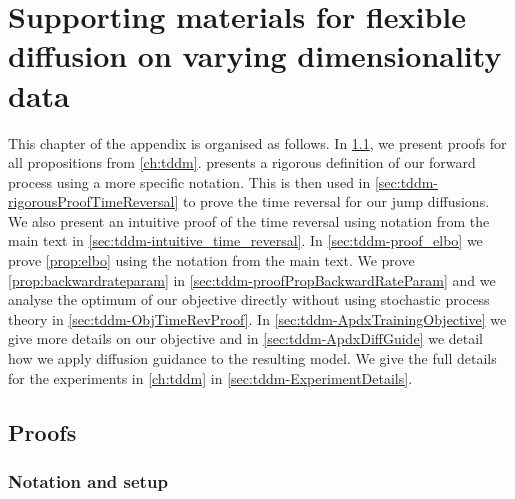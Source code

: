 \chapter{Supporting materials for flexible diffusion on varying dimensionality data}


This chapter of the appendix is organised as follows.  In \cref{sec:tddm-Proofs}, we present proofs for all propositions from \cref{ch:tddm}.  presents a rigorous definition of our forward process using a more specific notation. This is then used in \cref{sec:tddm-rigorousProofTimeReversal} to prove the time reversal for our jump diffusions. We also present an intuitive proof of the time reversal using notation from the main text in \cref{sec:tddm-intuitive_time_reversal}. In \cref{sec:tddm-proof_elbo} we prove \cref{prop:elbo} using the notation from the main text. We prove \cref{prop:backwardrateparam} in \cref{sec:tddm-proofPropBackwardRateParam} and we analyse the optimum of our objective directly without using stochastic process theory in \cref{sec:tddm-ObjTimeRevProof}. In \cref{sec:tddm-ApdxTrainingObjective} we give more details on our objective and in \cref{sec:tddm-ApdxDiffGuide} we detail how we apply diffusion guidance to the resulting model. We give the full details for the experiments in \cref{ch:tddm} in \cref{sec:tddm-ExperimentDetails}.

\section{Proofs}
\label{sec:tddm-Proofs}

\subsection{Notation and setup}
\label{sec:tddm-notation}

\def \msb {\mathsf{B}}
\def \Jbb{\mathbb{J}}
\def \Pbb{\mathbb{P}}
\def \Kbb{\mathbb{K}}
\def \rmd{\mathrm{d}}
\def \msp{\mathsf{P}}
\def \Jker{\mathbb{J}}
\def \msd{\mathsf{D}}
\def \calR{\mathcal{R}}
\def \rset{\mathbb{R}}
\def \msx{\mathsf{X}}
\def \mcx{\mathcal{X}}
\def \nset{\mathbb{N}}
\def \dim{\mathrm{dim}}
\def \rmc{\mathrm{C}}
\def \bfX{\mathbf{X}}
\def \bfY{\mathbf{Y}}
\def \Pker{\mathrm{P}}
\def \Qker{\mathrm{Q}}
\def \Jker{\mathrm{J}}
\def \msa{\mathsf{A}}

